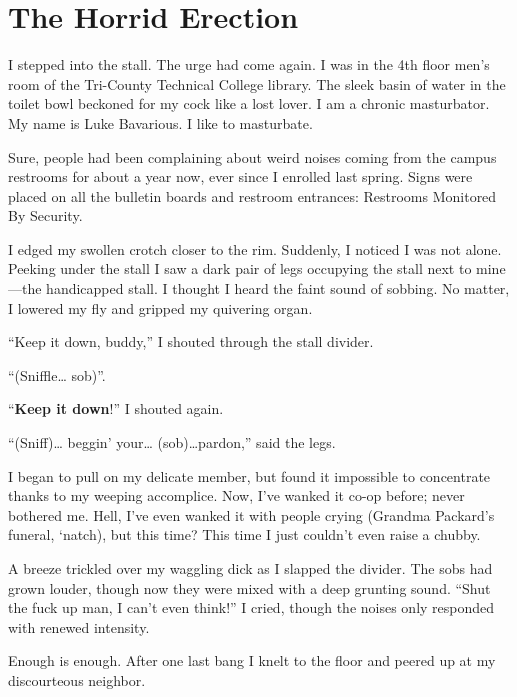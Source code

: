 \chapter{The Horrid Erection}


I stepped into the stall. The urge had come again. I was in the 4th
floor men's room of the Tri-County Technical College library.
The sleek basin of water in the toilet bowl beckoned for my cock
like a lost lover. I am a chronic masturbator. My name is Luke
Bavarious. I like to masturbate.



Sure, people had been complaining about weird noises coming from the
campus restrooms for about a year now, ever since I enrolled last
spring. Signs were placed on all the bulletin boards and restroom
entrances: {\sc Restrooms Monitored By Security}.



I edged my swollen crotch closer to the rim. Suddenly, I noticed I
was not alone. Peeking under the stall I saw a dark pair of legs
occupying the stall next to mine---the handicapped stall. I
thought I heard the faint sound of sobbing. No matter, I lowered my
fly and gripped my quivering organ.



``Keep it down, buddy,'' I shouted through the stall
divider.

``(Sniffle{\ldots} sob)''.

``{\bf Keep it down}!'' I shouted again.

``(Sniff){\ldots} beggin' your{\ldots}
(sob){\ldots}pardon,'' said the legs.



I began to pull on my delicate member, but found it impossible to
concentrate thanks to my weeping accomplice. Now, I've wanked
it co-op before; never bothered me. Hell, I've even wanked it
with people crying (Grandma Packard's funeral, `natch),
but this time? This time I just couldn't even raise a
chubby.



A breeze trickled over my waggling dick as I slapped the divider.
The sobs had grown louder, though now they were mixed with a deep
grunting sound. ``Shut the fuck up man, I can't even
think!'' I cried, though the noises only responded with
renewed intensity.



Enough is enough. After one last bang I knelt to the floor and
peered up at my discourteous neighbor.



